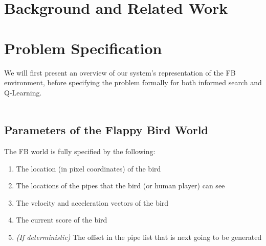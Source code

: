 \documentclass[11pt]{article}
\begin{document}
\section{Background and Related Work}



\section{Problem Specification}

We will first present an overview of our system's representation of the FB
environment, before specifying the problem formally for both informed search
and Q-Learning.\\\\
\subsection{Parameters of the Flappy Bird World}
The FB world is fully specified by the following:
\begin{enumerate}
    \item The location (in pixel coordinates) of the bird
    \item The locations of the pipes that the bird (or human player) can see
    \item The velocity and acceleration vectors of the bird
    \item The current score of the bird
    \item \emph{(If deterministic)} The offset in the pipe list that is next going to be generated
\end{enumerate}
\end{document}
